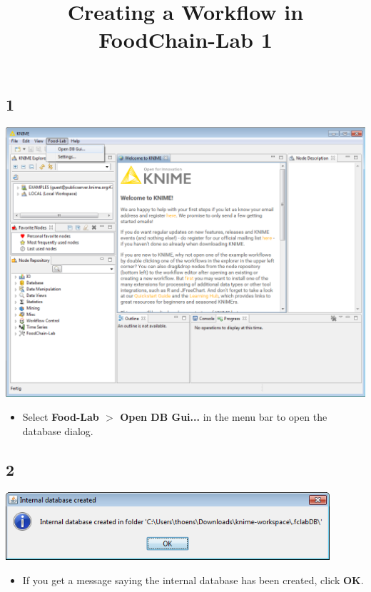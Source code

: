 \documentclass{beamer}
\title{Creating a Workflow in FoodChain-Lab 1}
\date{}
\begin{document}
\maketitle

\section{ }
 
\subsection{1}
\begin{frame}
	\begin{center}
  		\includegraphics[height=0.6\textheight]{1.png}
	\end{center}
	\begin{itemize}
		\item Select \textbf{Food-Lab $>$ Open DB Gui...} in the menu bar to open the database dialog.
	\end{itemize}
\end{frame}

\subsection{2}
\begin{frame}
	\begin{center}
  		\includegraphics[width=0.9\textwidth]{2.png}
	\end{center}
	\begin{itemize}
		\item If you get a message saying the internal database has been created, click \textbf{OK}.
	\end{itemize}
\end{frame}
\end{document}
